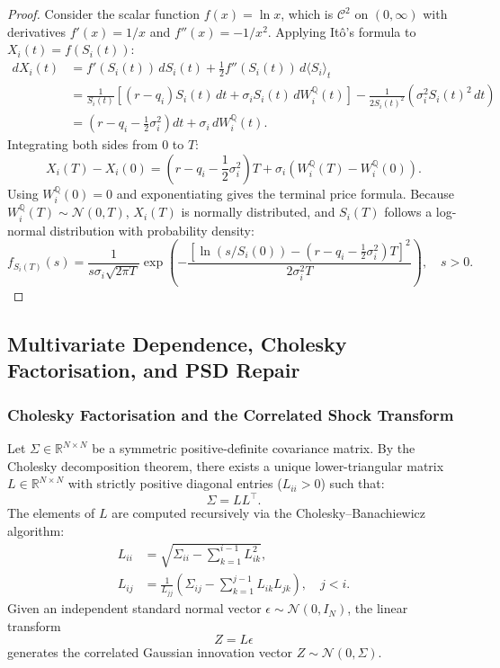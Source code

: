 \documentclass{article}
\theoremstyle{plain}
\theoremstyle{definition}
\theoremstyle{remark}
\begin{document}
\begin{proof}
Consider the scalar function $f(x) = \ln x$, which is $\mathcal{C}^2$ on $(0, \infty)$ with derivatives $f'(x) = 1/x$ and $f''(x) = -1/x^2$. Applying It\^o's formula to $X_i(t) = f(S_i(t))$:
\begin{align}
dX_i(t) &= f'(S_i(t))\,dS_i(t) + \frac{1}{2}f''(S_i(t))\,d\langle S_i \rangle_t \nonumber \\
&= \frac{1}{S_i(t)}\left[(r - q_i)S_i(t)\,dt + \sigma_i S_i(t)\,dW_i^{\mathbb{Q}}(t)\right] - \frac{1}{2S_i(t)^2}\left(\sigma_i^2 S_i(t)^2\,dt\right) \nonumber \\
&= \left(r - q_i - \frac{1}{2}\sigma_i^2\right)dt + \sigma_i\,dW_i^{\mathbb{Q}}(t).
\end{align}
Integrating both sides from $0$ to $T$:
\begin{equation}
X_i(T) - X_i(0) = \left(r - q_i - \frac{1}{2}\sigma_i^2\right)T + \sigma_i\left(W_i^{\mathbb{Q}}(T) - W_i^{\mathbb{Q}}(0)\right).
\end{equation}
Using $W_i^{\mathbb{Q}}(0) = 0$ and exponentiating gives the terminal price formula. Because $W_i^\mathbb{Q}(T) \sim \mathcal{N}(0, T)$, $X_i(T)$ is normally distributed, and $S_i(T)$ follows a log-normal distribution with probability density:
\begin{equation}
f_{S_i(T)}(s) = \frac{1}{s\sigma_i\sqrt{2\pi T}}\exp\left(-\frac{\left[\ln(s/S_i(0)) - (r - q_i - \frac{1}{2}\sigma_i^2)T\right]^2}{2\sigma_i^2 T}\right), \quad s > 0.
\end{equation}
\end{proof}

\subsection{Multivariate Dependence, Cholesky Factorisation, and PSD Repair}

\subsubsection{Cholesky Factorisation and the Correlated Shock Transform}
Let $\Sigma \in \mathbb{R}^{N \times N}$ be a symmetric positive-definite covariance matrix. By the Cholesky decomposition theorem, there exists a unique lower-triangular matrix $L \in \mathbb{R}^{N \times N}$ with strictly positive diagonal entries ($L_{ii} > 0$) such that:
\begin{equation}
\Sigma = L L^\top.
\end{equation}
The elements of $L$ are computed recursively via the Cholesky--Banachiewicz algorithm:
\begin{align}
L_{ii} &= \sqrt{\Sigma_{ii} - \sum_{k=1}^{i-1} L_{ik}^2}, \\
L_{ij} &= \frac{1}{L_{jj}}\left(\Sigma_{ij} - \sum_{k=1}^{j-1} L_{ik}L_{jk}\right), \quad j < i.
\end{align}
Given an independent standard normal vector $\epsilon \sim \mathcal{N}(0, I_N)$, the linear transform
\begin{equation}
Z = L\epsilon
\end{equation}
generates the correlated Gaussian innovation vector $Z \sim \mathcal{N}(0, \Sigma)$.
\end{document}
